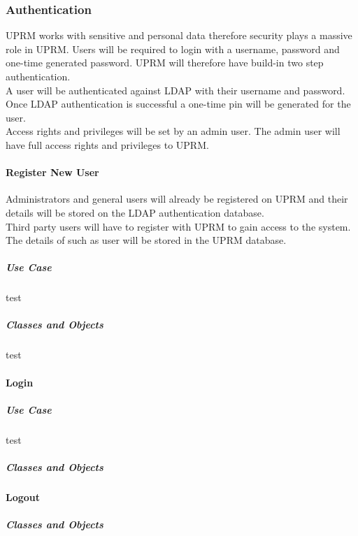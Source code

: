 
\subsubsection{Authentication}
UPRM works with sensitive and personal data therefore security plays a massive role in UPRM.
Users will be required to login with a username, password and one-time generated password. UPRM will therefore have build-in two step authentication. \\

A user will be authenticated against LDAP with their username and password. Once LDAP authentication is successful a one-time pin will be generated for the user.\\

Access rights and privileges will be set by an admin user. The admin user will have full access rights and privileges to UPRM.

\paragraph{Register New User\\}
Administrators and general users will already be registered on UPRM and their details will be stored on the LDAP authentication database.\\

Third party users will have to register with UPRM to gain access to the system. The details of such as user will be stored in the UPRM database.

\setcounter{secnumdepth}{5}
\subparagraph{Use Case\\}
test

\subparagraph{Classes and Objects\\}
test

\setcounter{secnumdepth}{4}
\paragraph{Login\\}

\setcounter{secnumdepth}{5}
\subparagraph{Use Case\\}
test

\subparagraph{Classes and Objects\\}


\setcounter{secnumdepth}{4}
\paragraph{Logout\\}

\setcounter{secnumdepth}{5}
\subparagraph{Classes and Objects\\}
